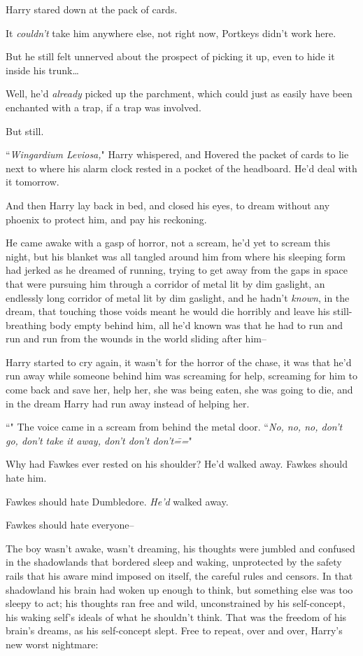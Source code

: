 Harry stared down at the pack of cards.

It \emph{couldn't} take him anywhere else, not right now, Portkeys didn't work here.

But he still felt unnerved about the prospect of picking it up, even to hide it inside his trunk{\ldots}

Well, he'd \emph{already} picked up the parchment, which could just as easily have been enchanted with a trap, if a trap was involved.

But still.

``\emph{Wingardium Leviosa,}" Harry whispered, and Hovered the packet of cards to lie next to where his alarm clock rested in a pocket of the headboard. He'd deal with it tomorrow.

And then Harry lay back in bed, and closed his eyes, to dream without any phoenix to protect him, and pay his reckoning.

\later

He came awake with a gasp of horror, not a scream, he'd yet to scream this night, but his blanket was all tangled around him from where his sleeping form had jerked as he dreamed of running, trying to get away from the gaps in space that were pursuing him through a corridor of metal lit by dim gaslight, an endlessly long corridor of metal lit by dim gaslight, and he hadn't \emph{known}, in the dream, that touching those voids meant he would die horribly and leave his still-breathing body empty behind him, all he'd known was that he had to run and run and run from the wounds in the world sliding after him\---

Harry started to cry again, it wasn't for the horror of the chase, it was that he'd run away while someone behind him was screaming for help, screaming for him to come back and save her, help her, she was being eaten, she was going to die, and in the dream Harry had run away instead of helping her.

``" The voice came in a scream from behind the metal door. ``\emph{No, no, no, don't go, don't take it away, don't don't don't\===}"

Why had Fawkes ever rested on his shoulder? He'd walked away. Fawkes should hate him.

Fawkes should hate Dumbledore. \emph{He'd} walked away.

Fawkes should hate everyone\---

The boy wasn't awake, wasn't dreaming, his thoughts were jumbled and confused in the shadowlands that bordered sleep and waking, unprotected by the safety rails that his aware mind imposed on itself, the careful rules and censors. In that shadowland his brain had woken up enough to think, but something else was too sleepy to act; his thoughts ran free and wild, unconstrained by his self-concept, his waking self's ideals of what he shouldn't think. That was the freedom of his brain's dreams, as his self-concept slept. Free to repeat, over and over, Harry's new worst nightmare:

